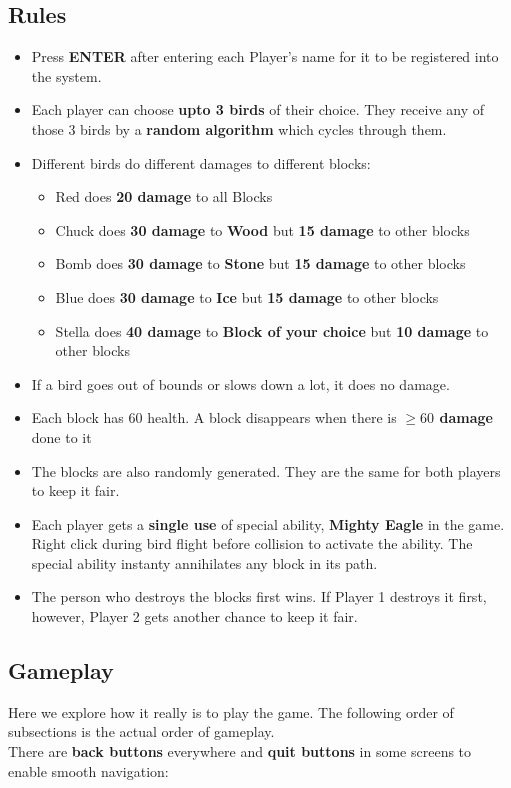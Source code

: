 \documentclass{article}
\begin{document}
\subsection{Rules}
\begin{itemize}
    \item Press \textbf{ENTER} after entering each Player's name for it to be registered into the system.
    \item Each player can choose \textbf{upto 3 birds} of their choice. They receive any of those 3 birds by a \textbf{random algorithm} which cycles through them.
    \item Different birds do different damages to different blocks:
    \begin{itemize}
        \item Red does \textbf{20 damage} to all Blocks
        \item Chuck does \textbf{30 damage} to \textbf{Wood} but \textbf{15 damage} to other blocks
        \item Bomb does \textbf{30 damage} to \textbf{Stone} but \textbf{15 damage} to other blocks
        \item Blue does \textbf{30 damage} to \textbf{Ice} but \textbf{15 damage} to other blocks
        \item Stella does \textbf{40 damage} to \textbf{Block of your choice} but \textbf{10 damage} to other blocks
    \end{itemize}
    \item If a bird goes out of bounds or slows down a lot, it does no damage.
    \item Each block has 60 health. A block disappears when there is \textbf{$ \geq 60$ damage} done to it
    \item The blocks are also randomly generated. They are the same for both players to keep it fair.
    \item Each player gets a \textbf{single use} of special ability, \textbf{Mighty Eagle} in the game. Right click during bird flight before collision to activate the ability. The special ability instanty annihilates any block in its path.
    \item The person who destroys the blocks first wins. If Player 1 destroys it first, however, Player 2 gets another chance to keep it fair.
\end{itemize}


\subsection{Gameplay}\label{subsec:gameplay}
Here we explore how it really is to play the game. The following order of subsections is the actual order of gameplay.\\ There are \textbf{back buttons} everywhere and \textbf{quit buttons} in some screens to enable smooth navigation:
\end{document}
